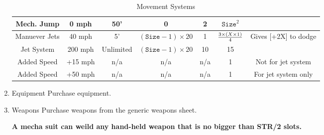 \documentclass[twoside]{book}
\begin{document}
\begin{enumerate}
\begin{table}[htb]
\begin{center}
\begin{tabular}{|c|c|c|c|c|c|c|}
\hline

 Mech. Jump & 0 mph & 50' & 0 & 2 &\begin{math}
                          {\texttt{Size}}^{ 2 }\end{math}
                      \\

\hline

 Manuever Jets & 40 mph & 5' &  \begin{math}   (   \texttt{Size} 
                          -    1    )   
                         \times     20   \end{math}
                      & 1 &  \begin{math}{{   3 
                         \times     (   X 
                          \times     1    )
                           }\over{ 4 }}\end{math}
                      & Gives [+2X] to dodge \\

\hline

 Jet System & 200 mph & Unlimited &  \begin{math}   (   \texttt{Size} 
                          -    1    )   
                         \times     20   \end{math}
                      & 10 & 15 \\

\hline

 Added Speed & +15 mph & n/a & n/a & n/a & 1 & Not for jet system \\

\hline

 Added Speed & +50 mph & n/a & n/a & n/a & 1 & For jet system only \\

\hline


  \end{tabular}
  
\caption{Movement Systems}
  
  \end{center}
\end{table}
    
              
  \item   
                Equipment  
                  Purchase equipment.   
              
  \item   
                Weapons  
                    Purchase weapons from the generic weapons
                   sheet. 
                  

 \textbf{ A mecha suit can weild any hand-held weapon that
                   is no bigger than STR/2 slots. }


              
\end{enumerate}
  
\end{document}
